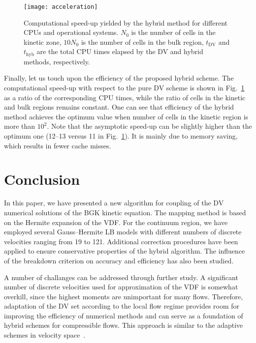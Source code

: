 \documentclass[]{elsarticle} %
\newcommand{\DV}{\mathrm{DV}}
\begin{document}
\begin{figure}
    \centering
    \texttt{[image: acceleration]}
    \caption{
        Computational speed-up yielded by the hybrid method for different CPUs and operational systems.
        $N_0$ is the number of cells in the kinetic zone, $10N_0$ is the number of cells in the bulk region,
        $t_\DV$ and $t_\mathrm{hyb}$ are the total CPU times elapsed by the DV and hybrid methods, respectively.
    }\label{fig:speed-up}
\end{figure}

Finally, let us touch upon the efficiency of the proposed hybrid scheme.
The computational speed-up with respect to the pure DV scheme is shown in Fig.~\ref{fig:speed-up} as a ratio of the corresponding CPU times,
while the ratio of cells in the kinetic and bulk regions remains constant.
One can see that efficiency of the hybrid method achieves the optimum value when number of cells in the kinetic region is more than $10^2$.
Note that the asymptotic speed-up can be slightly higher than the optimum one (12--13 versus 11 in Fig.~\ref{fig:speed-up}).
It is mainly due to memory saving, which results in fewer cache misses.

\section{Conclusion}\label{sec:summary}


In this paper, we have presented a new algorithm for coupling of the DV numerical solutions of the BGK kinetic equation.
The mapping method is based on the Hermite expansion of the VDF.
For the continuum region, we have employed several Gauss--Hermite LB models with different numbers of discrete velocities ranging from 19 to 121.
Additional correction procedures have been applied to ensure conservative properties of the hybrid algorithm.
The influence of the breakdown criterion on accuracy and efficiency has also been studied.

A number of challanges can be addressed through further study.
A significant number of discrete velocities used for approximation of the VDF is somewhat overkill,
since the highest moments are unimportant for many flows.
Therefore, adaptation of the DV set according to the local flow regime provides room for improving the efficiency of numerical methods
and can serve as a foundation of hybrid schemes for compressible flows.
This approach is similar to the adaptive schemes in velocity space~\cite{Aristov1977, Kolobov2013, Baranger2014}.
\end{document}
